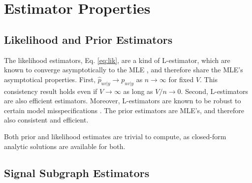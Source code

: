 \documentclass[10pt,journal,cspaper,compsoc]{IEEEtran}
\providecommand{\mh}[1]{\hat{#1}}
\newcommand{\conv}{\rightarrow}
\begin{document}
\section{Estimator Properties} %
\label{sec:results}

% 

\subsection{Likelihood and Prior Estimators} %
\label{ssub:subsubsection_name4}


The likelihood estimators, Eq. \eqref{eq:lik}, are a kind of L-estimator, which are known to converge asymptotically to the MLE \cite{Huber1981}, and therefore share the MLE's asymptotical properties. First, $\mh{p}_{uv|y} \conv p_{uv|y}$ as $n \conv \infty$ for fixed $V$. This consistency result holds even if  $V \conv \infty$ as long as $V/n \conv 0$.  Second, L-estimators are also efficient estimators. Moreover, L-estimators are known to be robust to certain model misspecifications \cite{Huber1981}. The prior estimators are MLE's, and therefore also consistent and efficient.



Both prior and likelihood estimates are trivial to compute, as closed-form analytic solutions are available for both.  %

\subsection{Signal Subgraph Estimators} %
\label{ssub:subsubsection_name5}
\end{document}
